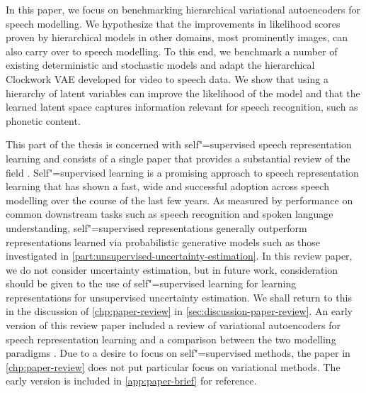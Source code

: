 In this paper, we focus on benchmarking hierarchical variational autoencoders for speech modelling. 
We hypothesize that the improvements in likelihood scores proven by hierarchical models in other domains, most prominently images, can also carry over to speech modelling. 
To this end, we benchmark a number of existing deterministic and stochastic models and adapt the hierarchical Clockwork VAE developed for video \parencite{saxena_clockwork_2021} to speech data. 
We show that using a hierarchy of latent variables can improve the likelihood of the model and that the learned latent space captures information relevant for speech recognition, such as phonetic content. 


This part of the thesis is concerned with self"=supervised speech representation learning and consists of a single paper that provides a substantial review of the field \parencite{mohamed_selfsupervised_2022}. 
Self"=supervised learning is a promising approach to speech representation learning that has shown a fast, wide and successful adoption across speech modelling over the course of the last few years. 
As measured by performance on common downstream tasks such as speech recognition and spoken language understanding, self"=supervised representations generally outperform representations learned via probabilistic generative models such as those investigated in \cref{part:unsupervised-uncertainty-estimation}. 
In this review paper, we do not consider uncertainty estimation, but in future work, consideration should be given to the use of self"=supervised learning for learning representations for unsupervised uncertainty estimation. 
We shall return to this in the discussion of \cref{chp:paper-review} in \cref{sec:discussion-paper-review}.
An early version of this review paper included a review of variational autoencoders for speech representation learning and a comparison between the two modelling paradigms \parencite{borgholt_brief_2022}. 
Due to a desire to focus on self"=supervised methods, the paper in \cref{chp:paper-review} does not put particular focus on variational methods. 
The early version is included in \cref{app:paper-brief} for reference.

